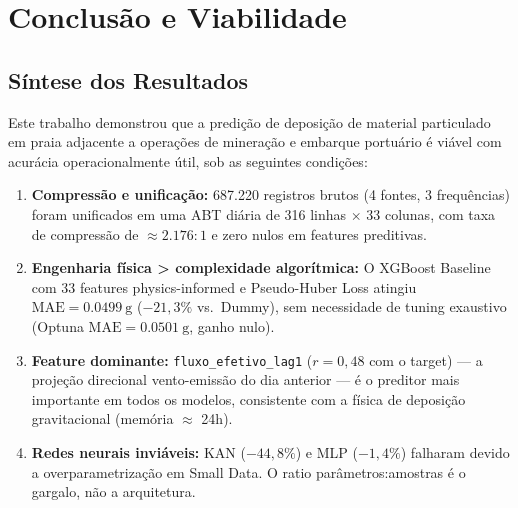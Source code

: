 \documentclass[12pt, a4paper]{article}
\newcommand{\feature}[1]{\texttt{#1}}
\newcommand{\mae}{\text{MAE}}
\begin{document}
\newpage
\section{Conclusão e Viabilidade}
\label{sec:conclusion}

\subsection{Síntese dos Resultados}

Este trabalho demonstrou que a predição de deposição de material
particulado em praia adjacente a operações de mineração e embarque
portuário é viável com acurácia operacionalmente útil, sob as
seguintes condições:

\begin{enumerate}
    \item \textbf{Compressão e unificação:} 687.220 registros brutos
          (4 fontes, 3 frequências) foram unificados em uma ABT diária
          de 316 linhas $\times$ 33 colunas, com taxa de compressão de
          $\approx 2.176{:}1$ e zero nulos em features preditivas.

    \item \textbf{Engenharia física > complexidade algorítmica:}
          O XGBoost Baseline com 33 features physics-informed e
          Pseudo-Huber Loss atingiu $\mae = \SI{0,0499}{\gram}$
          ($-21{,}3\%$ vs.\ Dummy), sem necessidade de tuning
          exaustivo (Optuna $\mae = \SI{0,0501}{\gram}$, ganho nulo).

    \item \textbf{Feature dominante:} \feature{fluxo\_efetivo\_lag1}
          ($r = 0{,}48$ com o target) --- a projeção direcional
          vento-emissão do dia anterior --- é o preditor mais
          importante em todos os modelos, consistente com a física de
          deposição gravitacional (memória $\approx$ 24h).

    \item \textbf{Redes neurais inviáveis:} KAN ($-44{,}8\%$) e MLP
          ($-1{,}4\%$) falharam devido a overparametrização em Small
          Data. O ratio parâmetros:amostras é o gargalo, não a
          arquitetura.
\end{enumerate}
\end{document}
